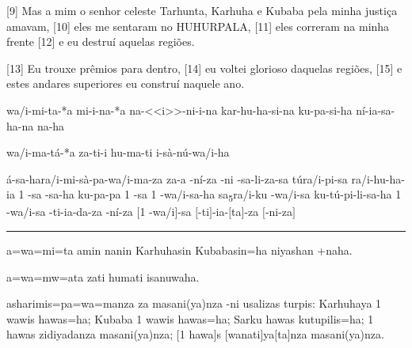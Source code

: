 [9] Mas a mim o senhor celeste Tarhunta, Karhuha e Kubaba pela minha justiça
amavam,
[10] eles me sentaram no HUHURPALA,
[11] eles correram na minha frente
	[12] e eu destruí aquelas regiões.

[13] Eu trouxe prêmios para dentro,
[14] eu voltei glorioso daquelas regiões,
[15] e estes andares superiores eu construí naquele ano.


\clearpage

\setcounter{parcount}{15}
\begin{parnumbersa}[]

	\raggedright%
	\itshape%


	wa/i-mi-ta-*a mi-i-na-*a na-<<i>>-ni-i-na kar-hu-ha-si-na ku-pa-si-ha ní-ia-sa-ha-na \lmasc{}na-ha

	wa/i-ma-tá-*a \lmasc{}za\lbreak{}-ti-i \lmasc{}hu-ma-ti \lmasc{}i-sà-nú-wa/i-ha

	á-sa-ha\logo{+}ra/i-mi-sà-pa-wa/i-ma-za \lmasc{}za-a -ní-za
	\lmasc{}-ni -sa-li-za-sa
	\lmasc{}tú\logo{+}ra/i-pi-sa
	ra/i-hu-ha-ia 1
	-sa -sa-ha
	ku-pa-pa 1 -sa 1
	-wa/i-sa-ha
	sa\textsubscript{5}\logo{+}ra/i-ku -wa/i-sa ku-tú-pi-li-sa-ha 1 -wa/i-sa \lmasc{}-ti-ia-da-za -ní-za \lbreak{} $[$1 -wa/i$]$-sa $[$-ti$]$-ia-$[$ta$]$-za $[$-ni-za$]$


\end{parnumbersa}

\vspace{10pt}
\hrule
\vspace{10pt}


\setcounter{parcount}{15}
\begin{parnumbersa}[]

	\raggedright%
	\itshape%


	a=wa=mi=ta amin nanin Karhuhasin Kubabasin=ha niyashan +naha.

	a=wa=mw=ata zati humati isanuwaha.

	asharimis=pa=wa=manza za masani{(ya)}nza -ni usalizas turpis:
	Karhuhaya 1 wawis hawas=ha;
	Kubaba 1 wawis hawas=ha;
	Sarku hawas kutupilis=ha;
	1 hawas zidiyadanza masani{(ya)}nza; $[$1 hawa$]$s $[$wanati$]$ya$[$ta$]$nza
	masani{(ya)}nza.


\end{parnumbersa}

